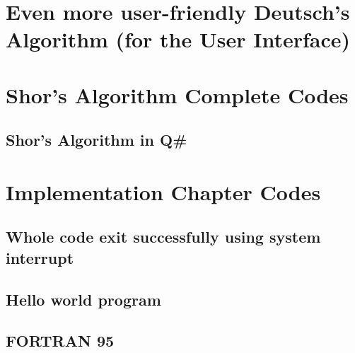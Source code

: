 \newpage
\section{Even more user-friendly Deutsch's Algorithm (for the User Interface)}



\newpage
\section{Shor's Algorithm Complete Codes}

\subsection{Shor's Algorithm in Q\#}


\newpage
\section{Implementation Chapter Codes}
\subsection{Whole code exit successfully using system interrupt}


\subsection{Hello world program}


\subsection{FORTRAN 95}

